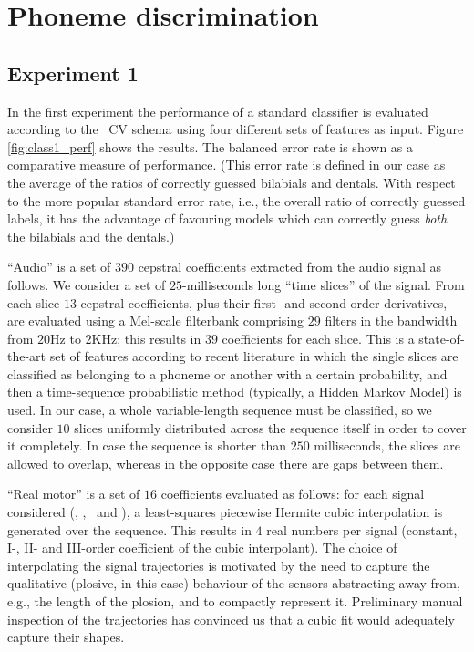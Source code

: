 \section{Phoneme discrimination}
\label{sec:class}

\subsection{Experiment 1}
\label{subsec:exp1}

In the first experiment the performance of a standard classifier is evaluated
according to the \overall\ CV schema using four different sets of features as
input. Figure \ref{fig:class1_perf} shows the results. The balanced error rate
is shown as a comparative measure of performance. (This error rate is defined in
our case as the average of the ratios of correctly guessed bilabials and dentals.
With respect to the more popular standard error rate, i.e., the overall ratio of correctly
guessed labels, it has the advantage of favouring models which can correctly guess
\emph{both} the bilabials and the dentals.)

``Audio'' is a set of $390$ cepstral coefficients extracted from the audio signal
as follows. We consider a set of $25$-milliseconds long ``time slices'' of the signal.
From each slice $13$ cepstral coefficients, plus their first- and second-order derivatives,
are evaluated using a Mel-scale filterbank comprising $29$ filters in the bandwidth from
$20$Hz to $2$KHz; this results in $39$ coefficients for each slice. This is a state-of-the-art
set of features according to recent literature \cite{bourl,pinto:icassp-phnrecog:2008}
in which the single slices are classified as belonging to a phoneme or another with a certain
probability, and then a time-sequence probabilistic method (typically, a Hidden Markov Model)
is used. In our case, a whole variable-length sequence must be classified, so we consider
$10$ slices uniformly distributed across the sequence itself in order to cover it completely.
In case the sequence is shorter than $250$ milliseconds, the slices are allowed to overlap,
whereas in the opposite case there are gaps between them.

``Real motor'' is a set of $16$ coefficients evaluated as follows: for each
signal considered (\vlio, \alio, \vttu\ and \attu), a least-squares piecewise
Hermite cubic interpolation is generated over the sequence. This results in $4$ real
numbers per signal (constant, I-, II- and III-order coefficient of the cubic
interpolant). The choice of interpolating the signal trajectories is motivated by
the need to capture the qualitative (plosive, in this case) behaviour of the sensors
abstracting away from, e.g., the length of the plosion, and to compactly represent it.
Preliminary manual inspection of the trajectories has convinced us that a cubic fit
would adequately capture their shapes.

